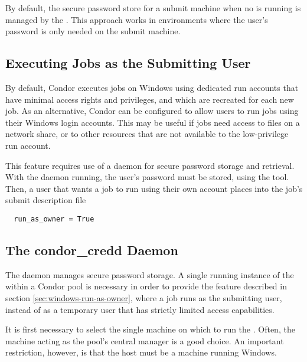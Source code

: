 By default, the secure password store for a submit machine when no
 is running is managed by the .
This approach works in environments where
the user's password is only needed on the submit machine.

\subsection{\label{sec:windows-run-as-owner}Executing Jobs as the Submitting User}

By default, Condor executes jobs on Windows using dedicated run
accounts that have minimal access rights and privileges,
and which are recreated for each new job.
As an alternative, Condor can be configured to allow users to run jobs using
their Windows login accounts. 
This may be useful if jobs need access to files on a network share,
or to other resources that are not available to the low-privilege run account.

This feature requires use of a  daemon for secure
password storage and retrieval. 
With the  daemon running,
the user's password must be stored, using the  tool.
Then,
a user that wants a job to run using their own account
places into the job's submit description file
\begin{verbatim}
  run_as_owner = True
\end{verbatim}

\subsection{\label{sec:credd}The condor\_credd Daemon}
The  daemon manages secure password storage.
A single running instance of the  within a Condor pool
is necessary in order to provide the feature described in 
section \ref{sec:windows-run-as-owner},
where a job runs as the submitting user, 
instead of as a temporary user that has strictly limited access capabilities.

It is first necessary to select
the single machine on which to run the . 
Often, the machine acting as the pool's central manager is a good choice.
An important restriction, however, is that the  host must be a
machine running Windows.

